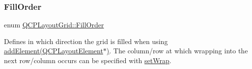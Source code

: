 \mbox{\label{class_q_c_p_layout_grid_a7d49ee08773de6b2fd246edfed353cca}} 
\subsubsection{\texorpdfstring{Fill\+Order}{FillOrder}\hspace{0.1cm}{\footnotesize\ttfamily [2/2]}}
{\footnotesize\ttfamily enum \hyperlink{class_q_c_p_layout_grid_a7d49ee08773de6b2fd246edfed353cca}{Q\+C\+P\+Layout\+Grid\+::\+Fill\+Order}}

Defines in which direction the grid is filled when using \hyperlink{class_q_c_p_layout_grid_a4c44025dd25acd27e053cadfd448ad7b}{add\+Element(\+Q\+C\+P\+Layout\+Element$\ast$)}. The column/row at which wrapping into the next row/column occurs can be specified with \hyperlink{class_q_c_p_layout_grid_ab36af18d77e4428386d02970382ee598}{set\+Wrap}.

